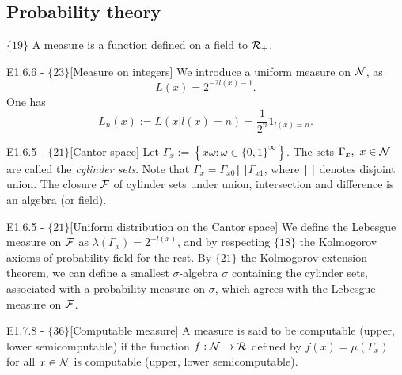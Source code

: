 \documentclass{article}
\begin{document}
\subsection{Probability theory}
$\{19\}$ A measure is a function defined on a field to $\mathcal{R}_+$.

\begin{flexidefinition}{E1.6.6 - $\{23\}$}[Measure on integers]
    We introduce a uniform measure on $\mathcal{N}$, as
\begin{equation}
    L(x) = 2^{-2l(x)-1}.
\end{equation}
One has
\begin{equation}
    L_n(x) := L(x|l(x) = n) = \frac{1}{2^n} 1_{l(x)=n}.
\end{equation}
\end{flexidefinition}

\begin{flexidefinition}{E1.6.5 - $\{21\}$}[Cantor space]
    Let $\Gamma_x := \left\{x \omega: \omega \in \{0,1\}^\infty \right\}$. The sets $\Gamma_x, \ x \in \mathcal{N}$ are called the \textit{cylinder sets}. Note that $\Gamma_x = \Gamma_{x0} \bigsqcup \Gamma_{x1}$, where $\bigsqcup$ denotes disjoint union. The closure $\mathcal{F}$ of cylinder sets under union, intersection and difference is an algebra (or field). 
\end{flexidefinition}

\begin{flexidefinition}{E1.6.5 - $\{21\}$}[Uniform distribution on the Cantor space]
    We define the Lebesgue measure on $\mathcal{F}$ as $\lambda(\Gamma_x) = 2^{-l(x)}$, and by respecting $\{18\}$ the Kolmogorov axioms of probability field for the rest. By $\{21\}$ the Kolmogorov extension theorem, we can define a smallest $\sigma$-algebra $\sigma$ containing the cylinder sets, associated with a probability measure on $\sigma$, which agrees with the Lebesgue measure on $\mathcal{F}$.
\end{flexidefinition}

\begin{flexidefinition}{E1.7.8 - $\{36\}$}[Computable measure]
    A measure is said to be computable (upper, lower semicomputable) if the function $f : \mathcal{N} \to \mathcal{R}$ defined by $f(x) = \mu(\Gamma_x)$ for all $x \in \mathcal{N}$ is computable (upper, lower semicomputable).
\end{flexidefinition}
\end{document}
